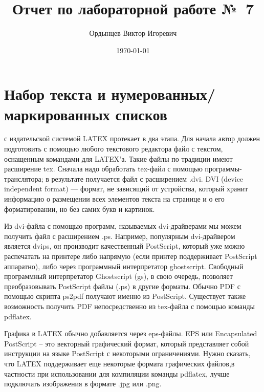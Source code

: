 \documentclass{report} %
\title{Отчет по лабораторной работе №~7}
\author{Ордынцев Виктор Игоревич} %
\date{\today}
\begin{document}
\maketitle %
  
\tableofcontents %

\newpage

\section{Набор текста и нумерованных/маркированных списков}

 с издательской системой LATEX протекает в два этапа. Для начала автор должен подготовить с помощью любого текстового редактора файл с текстом, оснащенным командами для LATEX’а. Такие файлы по традиции имеют расширение tex. Сначала надо обработать tex-файл с помощью программы-транслятора; в результате получается файл с расширением .dvi. DVI (device independent format) — формат, не зависящий от устройства, который хранит информацию о размещении всех элементов текста на странице и о его форматировании, но без самих букв и картинок. 

Из dvi-файла с помощью программ, называемых dvi-драйверами мы можем получить файл с расширением .ps. Например, популярным dvi-драйвером является dvips, он производит качественный PostScript, который уже можно распечатать на принтере либо напрямую (если принтер поддерживает PostScript аппаратно), либо через программный интерпретатор ghostscript. Свободный программный интерпретатор Ghostscript (gs), в свою очередь, позволяет преобразовывать PostScript файлы (.ps) в другие форматы. Обычно PDF с помощью скрипта ps2pdf получают именно из PostScript. Существует также возможность получить PDF непосредственно из tex-файла с помощью команды pdflatex. 

Графика в LATEX обычно добавляется через eps-файлы. EPS или Encapsulated PostScript – это векторный графический формат, который представляет собой инструкции на языке PostScript с некоторыми ограничениями. Нужно сказать, что LATEX поддерживает еще некоторые формата графических файлов,в частности при использовании для компиляции команды pdflatex, лучше подключать изображения в формате .jpg или .png. 
\end{document}
